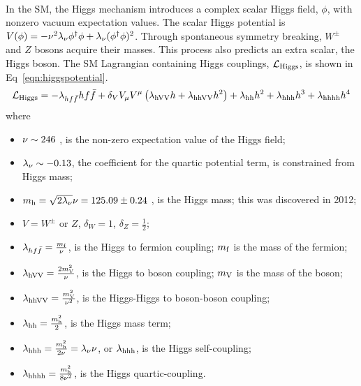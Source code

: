 \paragraph{}
In the SM, the Higgs mechanism introduces a complex scalar Higgs field, $\phi$, with nonzero vacuum expectation values. The scalar Higgs potential is $V(\phi) = -\nu^2\lambda_{\rm \nu} \phi^{\dagger}\phi + \lambda_{\rm \nu}(\phi^\dagger\phi)^2$. Through spontaneous symmetry breaking, $W^{\pm}$ and $Z$ bosons acquire their masses.  This process also predicts an extra scalar, the Higgs boson. The SM Lagrangian containing Higgs couplings, $\mathcal{L}_{\rm Higgs}$, is shown in Eq~\ref{eqn:higgspotential}.
\begin{equation}
\label{eqn:higgspotential}
\mathcal{L}_{\rm Higgs} = -\lambda_{hf\bar{f}} hf\bar{f} + \delta_{V} V_{\rm\mu} V^{\rm\mu}\left(\lambda_{\rm hVV} h + \lambda_{\rm hhVV}h^2\right) + \lambda_{\rm hh}h^2 + \lambda_{\rm hhh}h^3 + \lambda_{\rm hhhh}h^4 
\end{equation}
where 
\begin{itemize}
	\item $\rm\nu \sim 246$ \GeV, is the non-zero expectation value of the Higgs field;\
	\item $\lambda_{\rm \nu} \sim -0.13$, the coefficient for the quartic potential term, is constrained from Higgs mass;
  \item $m_{\rm h} = \sqrt{2\lambda_{\rm \nu}}\nu = 125.09 \pm 0.24$ \GeV, is the Higgs mass; this was discovered in 2012\cite{ATLASHiggsDisc, CMSHiggsDisc}; 
	\item $V = W^{\pm}$ or $Z$, $\delta_{W} = 1$, $\delta_{Z} = \frac{1}{2}$;
	\item $\lambda_{hf\bar{f}} = \frac{m_{\rm f}}{\rm\nu}$, is the Higgs to fermion coupling; $m_{\rm f}$ is the mass of the fermion;
	\item $\lambda_{\rm hVV} = \frac{2m_{\rm V}^2}{\rm\nu}$, is the Higgs to boson coupling; $m_{\rm V}$ is the mass of the boson;
	\item $\lambda_{\rm hhVV} = \frac{m_{\rm V}^2}{\rm\nu^2}$, is the Higgs-Higgs to boson-boson coupling;
	\item $\lambda_{\rm hh} = \frac{m_{\rm h}^2}{2}$, is the Higgs mass term;
	\item $\lambda_{\rm hhh} = \frac{m_{\rm h}^2}{2\rm\nu} = \lambda_{\rm \nu} \nu$, or $\lambda_{\rm hhh}$, is the Higgs self-coupling;
	\item $\lambda_{\rm hhhh} = \frac{m_{\rm h}^2}{8\rm\nu^2}$, is the Higgs quartic-coupling.
\end{itemize}
